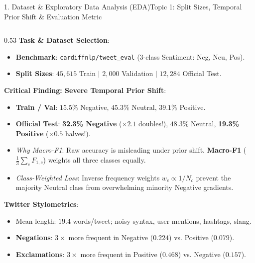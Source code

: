 \documentclass[aspectratio=169, 10pt]{beamer}
\begin{document}
\begin{frame}[shrink=8]{1. Dataset \& Exploratory Data Analysis (EDA)}{Topic 1: Split Sizes, Temporal Prior Shift \& Evaluation Metric}
\begin{columns}[T]
\begin{column}{0.53\textwidth}
    \scriptsize
    \textbf{Task \& Dataset Selection}:
    \begin{itemize}\setlength\itemsep{1.5pt}
        \item \textbf{Benchmark}: \texttt{cardiffnlp/tweet\_eval} (3-class Sentiment: Neg, Neu, Pos).
        \item \textbf{Split Sizes}: $45,615$ Train $\mid$ $2,000$ Validation $\mid$ $12,284$ Official Test.
    \end{itemize}
    \vspace{2pt}
    \textbf{Critical Finding: Severe Temporal Prior Shift}:
    \begin{itemize}\setlength\itemsep{1.5pt}
        \item \textbf{Train / Val}: $15.5\%$ Negative, $45.3\%$ Neutral, $39.1\%$ Positive.
        \item \textbf{Official Test}: \textbf{32.3\% Negative} ($\mathbf{\times 2.1}$ doubles!), $48.3\%$ Neutral, \textbf{19.3\% Positive} ($\mathbf{\times 0.5}$ halves!).
        \item \emph{Why Macro-F1}: Raw accuracy is misleading under prior shift. \textbf{Macro-F1} ($\frac{1}{3}\sum_{c} F_{1,c}$) weights all three classes equally.
        \item \emph{Class-Weighted Loss}: Inverse frequency weights $w_c \propto 1/N_c$ prevent the majority Neutral class from overwhelming minority Negative gradients.
    \end{itemize}
    \vspace{2pt}
    \textbf{Twitter Stylometrics}:
    \begin{itemize}\setlength\itemsep{1.5pt}
        \item Mean length: $19.4$ words/tweet; noisy syntax, user mentions, hashtags, slang.
        \item \textbf{Negations}: $3\times$ more frequent in Negative ($0.224$) vs. Positive ($0.079$).
        \item \textbf{Exclamations}: $3\times$ more frequent in Positive ($0.468$) vs. Negative ($0.157$).

\end{itemize}
\end{column}
\end{columns}
\end{frame}
\end{document}
